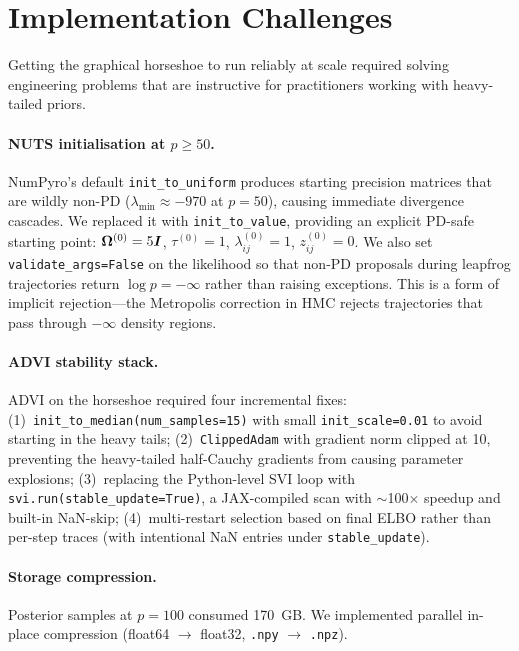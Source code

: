 \documentclass[10pt,conference,compsoc]{IEEEtran}
\begin{document}
\section{Implementation Challenges}
\label{sec:engineering}

Getting the graphical horseshoe to run reliably at scale required solving engineering problems that are instructive for practitioners working with heavy-tailed priors.

\paragraph{NUTS initialisation at $p \geq 50$.}
NumPyro's default \texttt{init\_to\_uniform} produces starting precision matrices that are wildly non-PD ($\lambda_{\min} \approx -970$ at $p{=}50$), causing immediate divergence cascades. We replaced it with \texttt{init\_to\_value}, providing an explicit PD-safe starting point: $\bm{\Omega}^{(0)} = 5\bm{I}$, $\tau^{(0)} = 1$, $\lambda_{ij}^{(0)} = 1$, $z_{ij}^{(0)} = 0$. We also set \texttt{validate\_args=False} on the likelihood so that non-PD proposals during leapfrog trajectories return $\log p = -\infty$ rather than raising exceptions. This is a form of implicit rejection---the Metropolis correction in HMC rejects trajectories that pass through $-\infty$ density regions.

\paragraph{ADVI stability stack.}
ADVI on the horseshoe required four incremental fixes: (1)~\texttt{init\_to\_median(num\_samples=15)} with small \texttt{init\_scale=0.01} to avoid starting in the heavy tails; (2)~\texttt{ClippedAdam} with gradient norm clipped at 10, preventing the heavy-tailed half-Cauchy gradients from causing parameter explosions; (3)~replacing the Python-level SVI loop with \texttt{svi.run(stable\_update=True)}, a JAX-compiled scan with $\sim$100$\times$ speedup and built-in NaN-skip; (4)~multi-restart selection based on final ELBO rather than per-step traces (with intentional NaN entries under \texttt{stable\_update}).

\paragraph{Storage compression.}
Posterior samples at $p=100$ consumed 170~GB. We implemented parallel in-place compression (float64 $\to$ float32, \texttt{.npy} $\to$ \texttt{.npz}).
\end{document}
